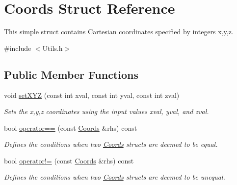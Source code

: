 \hypertarget{struct_coords}{}\section{Coords Struct Reference}
\label{struct_coords}


This simple struct contains Cartesian coordinates specified by integers x,y,z.  




{\ttfamily \#include $<$Utils.\+h$>$}

\subsection*{Public Member Functions}
\begin{DoxyCompactItemize}
\item 
void \hyperlink{struct_coords_a88de3a6ee710766eb9c9444cee45a9f3}{set\+X\+YZ} (const int xval, const int yval, const int zval)
\begin{DoxyCompactList}\small\item\em Sets the x,y,z coordinates using the input values xval, yval, and zval. \end{DoxyCompactList}\item 
bool \hyperlink{struct_coords_ad3347f6568814df1a2b98b3cd0b78632}{operator==} (const \hyperlink{struct_coords}{Coords} \&rhs) const
\begin{DoxyCompactList}\small\item\em Defines the conditions when two \hyperlink{struct_coords}{Coords} structs are deemed to be equal. \end{DoxyCompactList}\item 
bool \hyperlink{struct_coords_aaea2c566feec4e4bf56b27a34568be76}{operator!=} (const \hyperlink{struct_coords}{Coords} \&rhs) const
\begin{DoxyCompactList}\small\item\em Defines the conditions when two \hyperlink{struct_coords}{Coords} structs are deemed to be unequal. \end{DoxyCompactList}\end{DoxyCompactItemize}
